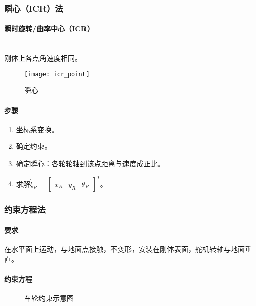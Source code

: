 \documentclass[
12pt, %
a4paper, 
oneside, %
headinclude,footinclude, %
]{scrartcl}
\begin{document}
\subsubsection[瞬心法]{瞬心（ICR）法}
\noindent
\begin{minipage}{0.4\textwidth}
\paragraph{瞬时旋转/曲率中心（ICR）}~\\
刚体上各点角速度相同。
\begin{figure}[H]
\centering 
\texttt{[image: icr\_point]} 
\caption{瞬心}
\end{figure}
\end{minipage}
\begin{minipage}{0.6\textwidth}
\paragraph{步骤}
\begin{enumerate}
\item 坐标系变换。
\item 确定约束。
\item 确定瞬心：各轮轮轴到该点距离与速度成正比。
\item 求解$ \dot{\xi}_R = \begin{bmatrix} \dot{x}_R & \dot{y}_R & \dot{\theta}_R \end{bmatrix}^T $。
\end{enumerate}
\end{minipage}
\subsubsection[约束方程法]{约束方程法}
\paragraph{要求}
在水平面上运动，与地面点接触，不变形，安装在刚体表面，舵机转轴与地面垂直。
\paragraph{约束方程}
\begin{figure}[H]
\centering
{} \quad
{} \quad
{}
\caption{车轮约束示意图}
\end{figure}
\end{document}

